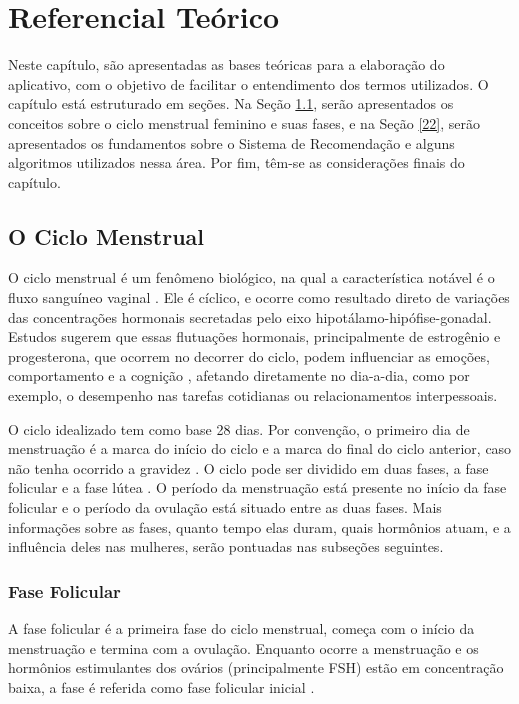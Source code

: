 \chapter[Referencial Teórico]{Referencial Teórico}
\label{ch:referencial}

Neste capítulo, são apresentadas as bases teóricas para a elaboração do 
aplicativo, com o objetivo de facilitar o entendimento dos termos utilizados. 
O capítulo está estruturado em seções. Na Seção \ref{21}, serão apresentados os 
conceitos sobre o ciclo menstrual feminino e suas fases, e na Seção \ref{22}, serão 
apresentados os fundamentos sobre o Sistema de Recomendação e alguns algoritmos 
utilizados nessa área. Por fim, têm-se as considerações finais do capítulo.

\section{O Ciclo Menstrual}
\label{21}

O ciclo menstrual é um fenômeno biológico, 
na qual a característica notável é o fluxo sanguíneo vaginal \cite{guyton2012}.
Ele é cíclico, e ocorre como resultado direto de variações das concentrações
hormonais secretadas pelo eixo hipotálamo-hipófise-gonadal. Estudos sugerem
que essas flutuações hormonais, principalmente de estrogênio e progesterona,
que ocorrem no decorrer do ciclo, podem influenciar as emoções,
comportamento e a cognição \cite{poroma2014}, afetando
diretamente no dia-a-dia, como por exemplo, o desempenho nas tarefas
cotidianas ou relacionamentos interpessoais.


O ciclo idealizado tem como base 28 dias. Por convenção, o primeiro dia de
menstruação é a marca do início do ciclo e a marca do final do ciclo
anterior, caso não tenha ocorrido a gravidez \cite{lenton1984a}. O ciclo
pode ser dividido em duas fases, a fase folicular e a fase lútea
\cite{brondin2008}. O período da menstruação está presente no início da
fase folicular e o período da ovulação está situado entre as duas fases.
Mais informações sobre as fases, quanto tempo elas duram, quais hormônios
atuam, e a influência deles nas mulheres, serão pontuadas nas subseções
seguintes.


\subsection{Fase Folicular}

A fase folicular é a primeira fase do ciclo menstrual, começa com o início
da menstruação e termina com a ovulação. Enquanto ocorre a menstruação e os
hormônios estimulantes dos ovários (principalmente FSH) estão em concentração
baixa, a fase é referida como fase folicular inicial \cite{lenton1984a}.

